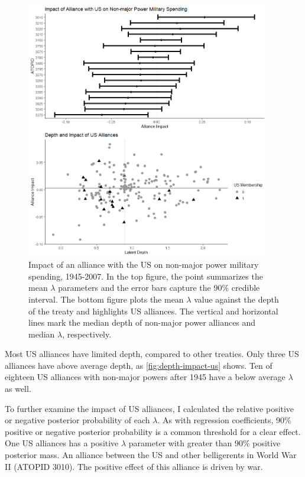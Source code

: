 \documentclass[12pt]{article}
\begin{document}
\begin{figure}[htbp]
	\centering
		\includegraphics[width=0.95\textwidth]{../figures/depth-impact-us.png}
	\caption{Impact of an alliance with the US on non-major power military spending, 1945-2007. In the top figure, the point summarizes the mean $\lambda$ parameters and the error bars capture the 90\% credible interval. The bottom figure plots the mean $\lambda$ value against the depth of the treaty and highlights US alliances. The vertical and horizontal lines mark the median depth of non-major power alliances and median $\lambda$, respectively.}
	\label{fig:depth-impact-us}
\end{figure}

Most US alliances have limited depth, compared to other treaties. 
Only three US alliances have above average depth, as \autoref{fig:depth-impact-us} shows. 
Ten of eighteen US alliances with non-major powers after 1945 have a below average $\lambda$ as well. 


To further examine the impact of US alliances, I calculated the relative positive or negative posterior probability of each $\lambda$. 
As with regression coefficients, 90\% positive or negative posterior probability is a common threshold for a clear effect. 
One US alliances has a positive $\lambda$ parameter with greater than 90\% positive posterior mass. 
An alliance between the US and other belligerents in World War II (ATOPID 3010). 
The positive effect of this alliance is driven by war.  
\end{document}
